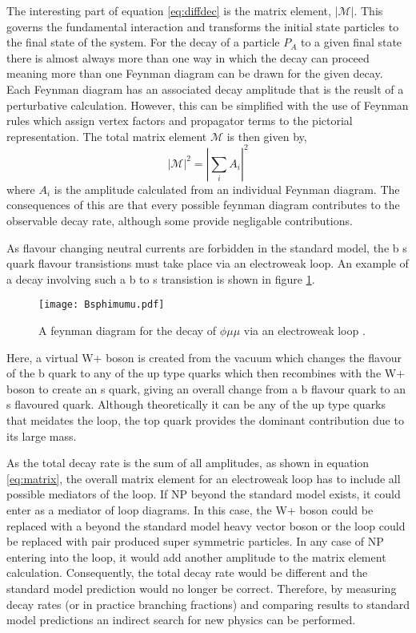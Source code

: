 The interesting part of equation {\ref{eq:diffdec}} is the matrix element, $|\mathscr{M}|$.  This governs the fundamental interaction and transforms the initial state particles to the final state of the system.  For the decay of a particle $P_A$ to a given final state there is almost always more than one way in which the decay can proceed meaning more than one Feynman diagram can be drawn for the given decay.  Each Feynman diagram has an associated decay amplitude that is the reuslt of a perturbative calculation.  However, this can be simplified with the use of Feynman rules which assign vertex factors and propagator terms to the pictorial representation.  The total matrix element $\mathscr{M}$ is then given by,
\begin{equation}
  \label{eq:matrix}
  |\mathscr{M}|^2=|\sum_i A_i|^2
\end{equation}
where $A_i$ is the amplitude calculated from an individual Feynman diagram.  The consequences of this are that every possible feynman diagram contributes to the observable decay rate, although some provide negligable contributions.

As flavour changing neutral currents are forbidden in the standard model, the b \to s quark flavour transistions must take place via an electroweak loop.  An example of a decay involving such a b to s transistion is shown in figure \ref{fig:btos}.
\begin{figure}
  \centering
  \texttt{[image: Bsphimumu.pdf]}
  \caption{A feynman diagram for the decay of \Bs \to $\phi \mu \mu$ via an electroweak loop \cite{LHCb-PAPER-2013-017}.}
  \label{fig:btos}
\end{figure}
Here, a virtual W+ boson is created from the vacuum which changes the flavour of the b quark to any of the up type quarks which then recombines with the W+ boson to create an s quark, giving an overall change from a b flavour quark to an s flavoured quark.  Although theoretically it can be any of the up type quarks that meidates the loop, the top quark provides the dominant contribution due to its large mass.

As the total decay rate is the sum of all amplitudes, as shown in equation \ref{eq:matrix}, the overall matrix element for an electroweak loop has to include all possible mediators of the loop.  If NP beyond the standard model exists, it could enter as a mediator of loop diagrams.  In this case, the W+ boson could be replaced with a beyond the standard model heavy vector boson or the loop could be replaced with pair produced super symmetric particles.  In any case of NP entering into the loop, it would add another amplitude to the matrix element calculation.  Consequently, the total decay rate would be different and the standard model prediction would no longer be correct.  Therefore, by measuring decay rates (or in practice branching fractions) and comparing results to standard model predictions an indirect search for new physics can be performed.

